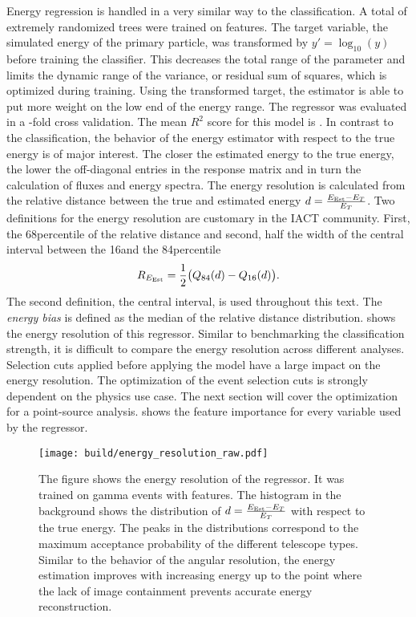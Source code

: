 Energy regression is handled in a very similar way to the classification. A total of  extremely 
randomized trees were trained on  features. 
The target variable, the simulated energy of the primary particle, 
was transformed by $y' = \log_{10}(y)$ before training the classifier. This decreases the total range of the parameter and limits the dynamic range of
the variance, or residual sum of squares, which is optimized during training. Using the transformed target, the estimator is able to 
put more weight on the low end of the energy range.
The regressor was evaluated in a -fold cross validation. 
The mean $R^2$ score for this model is . In contrast to the classification, the behavior of the energy estimator with 
respect to the true energy is of major interest. The closer the estimated energy to the true energy, the lower the off-diagonal entries in the 
response matrix and in turn the calculation of fluxes and energy spectra. 
The energy resolution is calculated from the relative distance between the true and estimated energy $d = \frac{E_\text{Est} - E_T}{E_T}$. Two definitions 
for the energy resolution are customary in the IACT community. 
First, the 68\th percentile of the relative distance and second, half the width of the central interval between the 16\th and the 84\th percentile
\begin{equation*}
    R_{E_\text{Est}} = \frac{1}{2} \bigl( Q_{84}(d)  - Q_{16}(d) \bigr).
\end{equation*}
The second definition, the central interval, is used throughout this text. The \emph{energy bias} is defined as the median of the relative distance distribution.
 shows the energy resolution of this regressor.
Similar to benchmarking the classification strength, it is difficult to compare the energy resolution across different analyses. 
Selection cuts applied before applying the model have a large impact on the energy resolution. 
The optimization of the event selection cuts is strongly dependent on the physics use case. The next section will cover the optimization for 
a point-source analysis. 
 shows the feature importance for every variable used by the regressor.

\begin{figure}[]
    \centering
    \texttt{[image: build/energy\_resolution\_raw.pdf]}
    \caption[Energy resolution]{The figure shows the energy resolution of the regressor. It was trained on \protect{}
    gamma events with \protect{} features.
    The histogram in the background shows the distribution of $d = \frac{E_\text{Est} - E_T}{E_T}$ with respect to the true energy.
    The peaks in the distributions correspond to the maximum acceptance probability of the different telescope types.
    Similar to the behavior of the angular resolution, the energy estimation improves 
    with increasing energy up to the point where the lack of image containment prevents accurate energy reconstruction.
    }
    \label{fig:energy_res_raw}
\end{figure}

